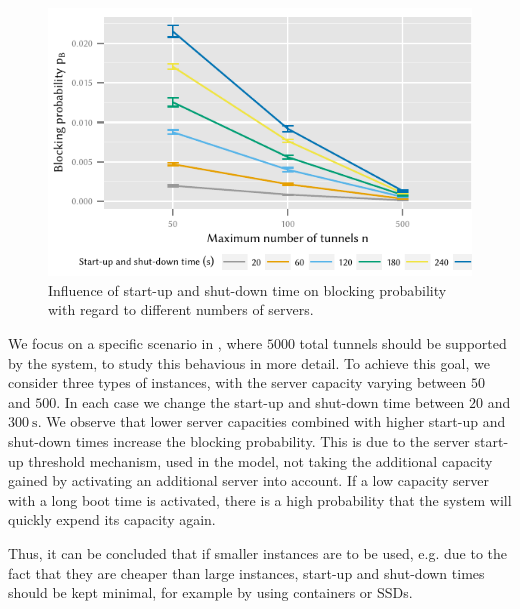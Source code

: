 \begin{figure}
  \centering
  \includegraphics{cloud/virtualized_network_functions/performance_evaluation/figures/compare_maxinstances_block}
  \caption{Influence of start-up and shut-down time on blocking probability with regard to different numbers of servers.}
  \label{fig:cloud_virtualized_network_functions:startup_shutdown:compare_maxinstances_block}
\end{figure}
 
We focus on a specific scenario in , where \(5000\) total tunnels should be supported by the system, to study this behavious in more detail.
To achieve this goal, we consider three types of instances, with the server capacity varying between \(50\) and \(500\).
In each case we change the start-up and shut-down time between \(20\) and \(\SI{300}{\second}\).
We observe that lower server capacities combined with higher start-up and shut-down times increase the blocking probability.
This is due to the server start-up threshold mechanism, used in the model, not taking the additional capacity gained by activating an additional server into account.
If a low capacity server with a long boot time is activated, there is a high probability that the system will quickly expend its capacity again.

Thus, it can be concluded that if smaller instances are to be used, e.g. due to the fact that they are cheaper than large instances, start-up and shut-down times should be kept minimal, for example by using containers or \glspl{SSD}.